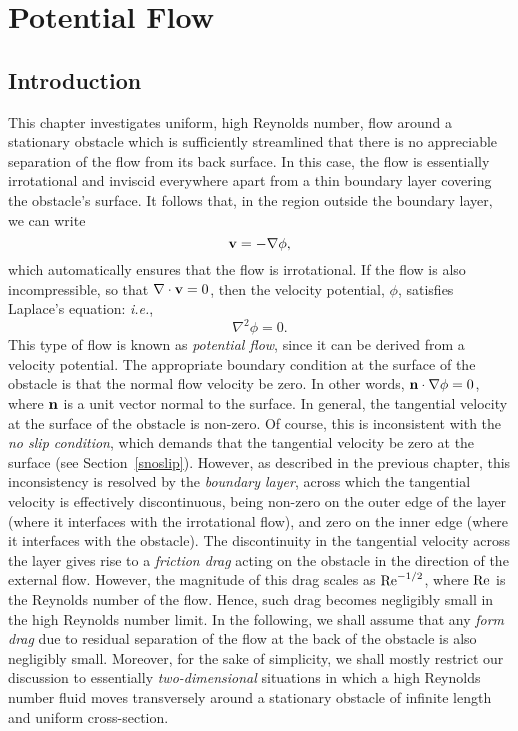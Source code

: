 \chapter{Potential Flow}
\section{Introduction}
This chapter investigates uniform, high Reynolds number,  flow around  a stationary obstacle which is sufficiently streamlined that there
is no appreciable separation of the flow from its back surface. In this case, the flow is essentially irrotational and inviscid
everywhere apart from a thin boundary layer covering the obstacle's surface. It follows that, in the region outside the
boundary layer, we can write
\begin{equation}
{\bf v} = -\nabla\phi,
\end{equation}
which automatically ensures that the flow is irrotational. If the flow is also incompressible, so that $\nabla\cdot{\bf v}=0$,
then the velocity potential, $\phi$, satisfies Laplace's equation: {\em i.e.},
\begin{equation}
\nabla^2\phi = 0.
\end{equation}
This type of flow is known as {\em potential flow}, since it can be derived from a velocity potential. 
The appropriate boundary condition at the surface of the obstacle is that the normal flow velocity be zero. In other
words, ${\bf n}\cdot\nabla\phi=0$, where ${\bf n}$ is a unit  vector normal to the surface. In general, the
tangential velocity at the surface of the obstacle is non-zero. Of course, this is inconsistent with the {\em no slip condition}, which
demands that the tangential velocity be zero at the surface (see Section~\ref{snoslip}). 
However, as described in the previous chapter,  this inconsistency is resolved by the {\em boundary layer}, across which the tangential velocity is
effectively discontinuous, being non-zero on the outer edge of the layer (where it interfaces with the irrotational
flow), and zero on the inner edge (where it interfaces with the obstacle). The discontinuity in the tangential
velocity across the layer gives rise to a {\em friction drag}\/ acting on the obstacle in the direction of the
  external flow. However, the magnitude of this drag scales as ${\rm Re}^{-1/2}$,  where ${\rm Re}$
is the Reynolds number of the  flow. Hence, such drag becomes negligibly small in the high Reynolds number limit.
In the following, we shall assume that any {\em form drag}\/ due to residual separation of the flow at the back of
the obstacle is also negligibly small. Moreover, for the sake of simplicity, we shall mostly  restrict our
discussion to essentially {\em two-dimensional}\/ situations in which a high Reynolds number fluid moves 
transversely around a stationary obstacle of infinite length and uniform cross-section. 

